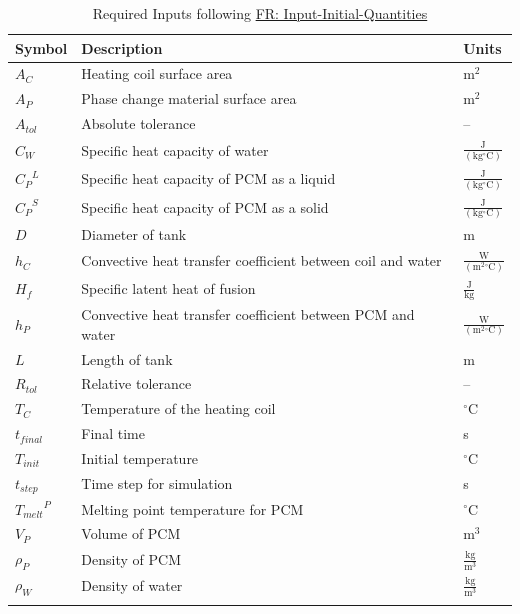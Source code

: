 \documentclass[12pt]{article}
\begin{document}
\begin{longtabu}{l X[l] l}
\toprule
Symbol & Description & Units
\\
\midrule
\endhead
${A_{C}}$ & Heating coil surface area & $\text{m}^{2}$
\\
${A_{P}}$ & Phase change material surface area & $\text{m}^{2}$
\\
${A_{tol}}$ & Absolute tolerance & --
\\
${C_{W}}$ & Specific heat capacity of water & $\frac{\text{J}}{(\text{kg}{}^{\circ}\text{C})}$
\\
${{C_{P}}^{L}}$ & Specific heat capacity of PCM as a liquid & $\frac{\text{J}}{(\text{kg}{}^{\circ}\text{C})}$
\\
${{C_{P}}^{S}}$ & Specific heat capacity of PCM as a solid & $\frac{\text{J}}{(\text{kg}{}^{\circ}\text{C})}$
\\
$D$ & Diameter of tank & m
\\
${h_{C}}$ & Convective heat transfer coefficient between coil and water & $\frac{\text{W}}{(\text{m}^{2}{}^{\circ}\text{C})}$
\\
${H_{f}}$ & Specific latent heat of fusion & $\frac{\text{J}}{\text{kg}}$
\\
${h_{P}}$ & Convective heat transfer coefficient between PCM and water & $\frac{\text{W}}{(\text{m}^{2}{}^{\circ}\text{C})}$
\\
$L$ & Length of tank & m
\\
${R_{tol}}$ & Relative tolerance & --
\\
${T_{C}}$ & Temperature of the heating coil & ${}^{\circ}$C
\\
${t_{final}}$ & Final time & s
\\
${T_{init}}$ & Initial temperature & ${}^{\circ}$C
\\
${t_{step}}$ & Time step for simulation & s
\\
${{T_{melt}}^{P}}$ & Melting point temperature for PCM & ${}^{\circ}$C
\\
${V_{P}}$ & Volume of PCM & $\text{m}^{3}$
\\
${ρ_{P}}$ & Density of PCM & $\frac{\text{kg}}{\text{m}^{3}}$
\\
${ρ_{W}}$ & Density of water & $\frac{\text{kg}}{\text{m}^{3}}$
\\
\bottomrule
\caption{Required Inputs following \hyperref[inputInitQuants]{FR: Input-Initial-Quantities}}
\label{Table:ReqInputs}
\end{longtabu}
\end{document}
